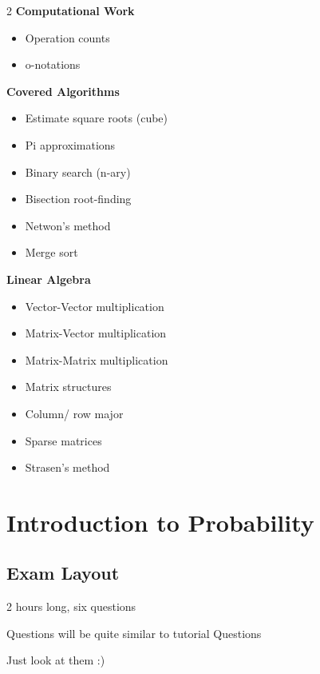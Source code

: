 \documentclass{article}
\begin{document}
\begin{multicols}{2}
\textbf{Computational Work}
\begin{itemize}
    \item Operation counts
    \item o-notations
\end{itemize}

\textbf{Covered Algorithms}
\begin{itemize}
    \item Estimate square roots (cube)
    \item Pi approximations
    \item Binary search (n-ary)
    \item Bisection root-finding
    \item Netwon's method
    \item Merge sort
\end{itemize}

\textbf{Linear Algebra}
\begin{itemize}
    \item Vector-Vector multiplication
    \item Matrix-Vector multiplication
    \item Matrix-Matrix multiplication
    \item Matrix structures
    \item Column/ row major
    \item Sparse matrices
    \item Strasen's method
\end{itemize}
\end{multicols}

\newpage
\section*{Introduction to Probability}
\subsection*{Exam Layout}
2 hours long, six questions

Questions will be quite similar to tutorial Questions

Just look at them :)
\end{document}
